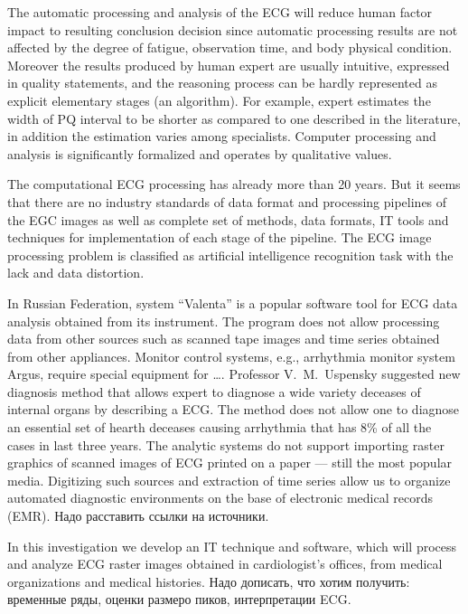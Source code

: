\documentclass[runningheads]{AIIT}
\newcommand{\nnn}[2][rcolor]{\noindent%
\textcolor{eclr}{}\textcolor{#1}{#2}\textcolor{eclr}{}}
\begin{document}
The automatic processing and analysis of the ECG will reduce human factor impact to resulting conclusion decision since automatic processing results are not affected by the degree of fatigue, observation time, and body physical condition.  Moreover the results produced by human expert are usually intuitive, expressed in quality statements, and the reasoning process can be hardly represented as explicit elementary stages (an algorithm).  For example, expert estimates the width of PQ interval to be shorter as compared to one described in the literature, in addition the estimation varies among specialists.  Computer processing and analysis is significantly formalized and operates by qualitative values.

The computational ECG processing has already more than 20 years.  But it seems that there are no industry standards of data format and processing pipelines of the EGC images as well as complete set of methods, data formats, IT tools and techniques for implementation of each stage of the pipeline.  The ECG image processing problem is classified as artificial intelligence recognition task with the lack and data distortion.

In Russian Federation, system ``Valenta'' is a popular software tool for ECG data analysis obtained from its instrument.  The program does not allow processing data from other sources such as scanned tape images and time series obtained from other appliances.  \nnn{Monitor control} systems, e.g., arrhythmia \nnn{monitor} system Argus, require special equipment \nnn{for \ldots}.  Professor V.~M.~Uspensky suggested new diagnosis method that allows expert to diagnose a wide variety deceases of internal organs by describing a ECG.  The method does not allow one to diagnose an essential set of hearth deceases causing arrhythmia that has 8\% of all the cases in last three years.  The analytic systems do not support importing raster graphics of scanned images of ECG printed on a paper --- still the most popular media.  Digitizing such sources and extraction of time series allow us to organize automated diagnostic environments on the base of electronic medical records (EMR). \nnn{Надо расставить ссылки на источники.}

In this investigation we develop an IT technique and software, which will process and analyze ECG raster images obtained in cardiologist's offices, from medical organizations and medical histories. \nnn{Надо дописать, что хотим получить: временные ряды, оценки размеро пиков, интерпретации ECG.}
\end{document}
